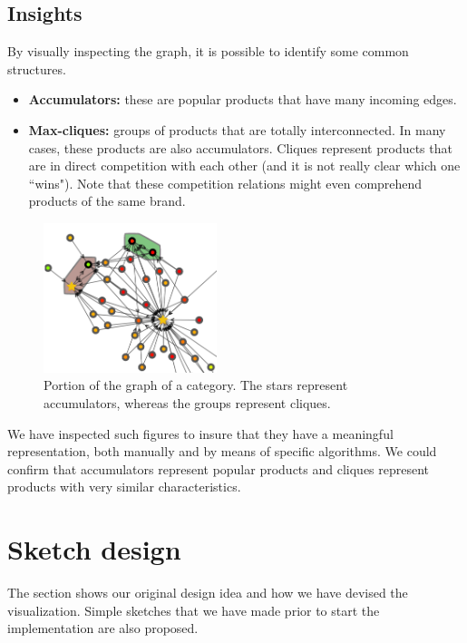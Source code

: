 \documentclass[a4paper,12pt]{article}
\begin{document}
\subsection{Insights}
By visually inspecting the graph, it is possible to identify some common structures.
\begin{itemize}
	\item \textbf{Accumulators:} these are popular products that have many incoming edges.
	\item \textbf{Max-cliques:} groups of products that are totally interconnected. In many cases, these products are also accumulators. Cliques represent products that are in direct competition with each other (and it is not really clear which one ``wins"). Note that these competition relations might even comprehend products of the same brand.
\end{itemize}
\begin{figure}
	\centering{}
	\includegraphics[width=0.45\textwidth]{img/insights.png}
	\caption{Portion of the graph of a category. The stars represent accumulators, whereas the groups represent cliques.}
	\label{fig:insights}
\end{figure}
We have inspected such figures to insure that they have a meaningful representation, both manually and by means of specific algorithms. We could confirm that accumulators represent popular products and cliques represent products with very similar characteristics.

\section{Sketch design}
\label{sec:sketch}
The section shows our original design idea and how we have devised the visualization. Simple sketches that we have made prior to start the implementation are also proposed.
\end{document}
